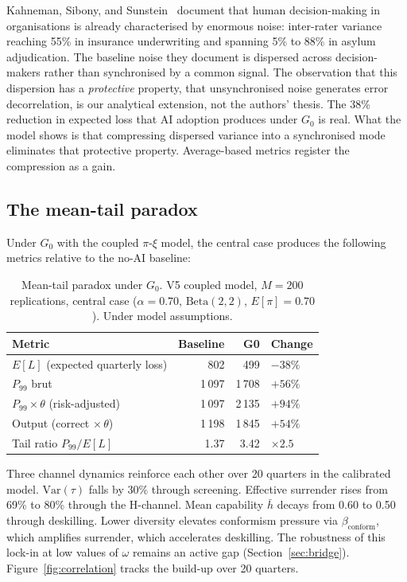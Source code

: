 \documentclass[11pt,a4paper]{article}
\begin{document}
Kahneman, Sibony, and Sunstein~\cite{kahneman_book_2021} document that human
decision-making in organisations is already characterised by enormous noise:
inter-rater variance reaching 55\% in insurance underwriting and spanning 5\%
to 88\% in asylum adjudication. The baseline noise they document is dispersed
across decision-makers rather than synchronised by a common signal. The
observation that this dispersion has a \textit{protective} property, that
unsynchronised noise generates error decorrelation, is our analytical
extension, not the authors' thesis. The 38\% reduction in expected loss that
AI adoption produces under $G_0$ is real. What the model shows is that
compressing dispersed variance into a synchronised mode eliminates that
protective property. Average-based metrics register the compression as a gain.

\subsection{The mean-tail paradox}

Under $G_0$ with the coupled $\pi$-$\xi$ model, the central case produces
the following metrics relative to the no-AI baseline:

\begin{table}[h!]
\centering
\small
\begin{tabular}{lrrl}
\toprule
\textbf{Metric} & \textbf{Baseline} & \textbf{G0} & \textbf{Change} \\
\midrule
$E[L]$ (expected quarterly loss) & 802 & 499 & $-38\%$ \\
$P_{99}$ brut & 1\,097 & 1\,708 & $+56\%$ \\
$P_{99}\times\theta$ (risk-adjusted) & 1\,097 & 2\,135 & $+94\%$ \\
Output (correct $\times\,\theta$) & 1\,198 & 1\,845 & $+54\%$ \\
Tail ratio $P_{99}/E[L]$ & 1.37 & 3.42 & $\times 2.5$ \\
\bottomrule
\end{tabular}
\caption{Mean-tail paradox under $G_0$. V5 coupled model, $M = 200$
replications, central case ($\alpha = 0.70$, $\mathrm{Beta}(2,2)$,
$E[\pi] = 0.70$). Under model assumptions.}
\label{tab:paradox}
\end{table}

Three channel dynamics reinforce each other over 20 quarters in the
calibrated model. $\text{Var}(\tau)$ falls by 30\% through screening.
Effective surrender rises from 69\% to 80\% through the H-channel. Mean
capability $\bar{h}$ decays from 0.60 to 0.50 through deskilling. Lower
diversity elevates conformism pressure via $\beta_{\text{conform}}$, which
amplifies surrender, which accelerates deskilling. The robustness of this
lock-in at low values of $\omega$ remains an active gap
(Section~\ref{sec:bridge}).
Figure~\ref{fig:correlation} tracks the build-up over 20 quarters.
\end{document}
